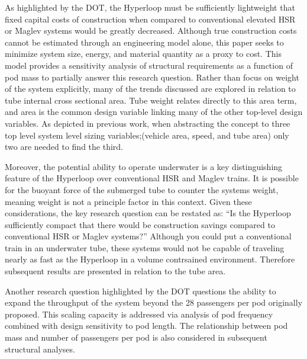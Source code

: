 	As highlighted by the DOT, the Hyperloop must be sufficiently lightweight
	that fixed capital costs of construction when compared to conventional
	elevated HSR or Maglev systems would be greatly decreased.
	Although true construction costs cannot be estimated through an engineering
	model alone, this paper seeks to minimize system size, energy, and material
	quantity as a proxy to cost. This model provides a sensitivity
	analysis of structural requirements as a function of pod mass to partially
	answer this research question. Rather than focus on weight of the system explicitly,
	many of the trends discussed are explored in relation to tube internal
	cross sectional area. Tube weight relates directly to this area term, and
	area is the common design variable linking many of the other top-level
	design variables. As depicted in previous work,
	\cite{Chin} when abstracting the concept to three top level system level
	sizing variables;(vehicle area, speed, and tube area) only two are needed
	to find the third.

	Moreover, the potential ability to operate underwater is a key distinguishing feature
	of the Hyperloop over conventional HSR and Maglev trains. It is possible for the buoyant force
	of the submerged tube to counter the systems weight, meaning weight is not
	a principle factor in this context.
	Given these considerations, the key research
	question can be restated as: ``Is the Hyperloop sufficiently compact that
	there would be construction savings compared to conventional
	HSR or Maglev systems?'' Although you could put a conventional train in an
	underwater tube, these systems would not be capable of traveling nearly as
	fast as the Hyperloop in a volume contrsained environment.
	Therefore subsequent results are presented in relation to the tube area.

	Another research question highlighted by the DOT questions the ability to
	expand the throughput of the system beyond the 28 passengers per pod
	originally proposed. This scaling capacity is addressed
	via analysis of pod frequency combined with design sensitivity to pod length.
	The relationship between pod mass and number of passengers per pod is also
	considered in subsequent structural analyses.


